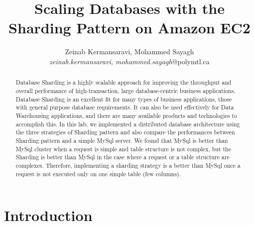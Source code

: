 \documentclass[10pt, conference]{IEEEtran}
\title{Scaling Databases with the Sharding Pattern on Amazon EC2}
\author{Zeinab Kermansaravi, Mohammed Sayagh
    \\
    \emph{zeinab.kermansaravi, mohammed.sayagh}@polymtl.ca}
\begin{document}
\maketitle

\begin{abstract}
\indent Database Sharding is a highly scalable approach for improving the throughput and overall performance of high-transaction, large database-centric business applications. Database Sharding is an excellent fit for many types of business applications, those with general purpose database requirements. It can also be used effectively for Data Warehousing applications, and there are many available products and technologies to accomplish this. In this lab, we implemented a distributed database architecture using the three strategies of Sharding pattern and also compare the performances between Sharding pattern and a simple MySql server. We found that MySql is better than MySql cluster when a request is simple and table structure is not complex, but the Sharding is better than MySql in the case where a request or a table structure are complexes. Therefore, implementing a sharding strategy is a better than MySql once a request is not executed only on one simple table (few columns). 

\end{abstract}

\section{Introduction}
\end{document}
